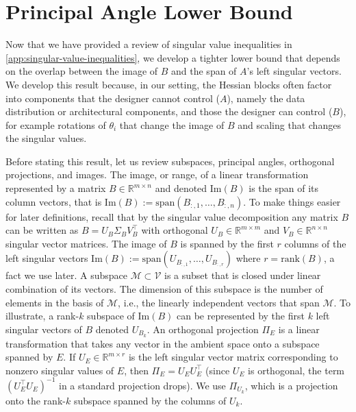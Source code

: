 \documentclass{article}
\theoremstyle{plain}
\theoremstyle{definition}
\theoremstyle{remark}
\begin{document}
\section{Principal Angle Lower Bound}
\label{app:principal-angle-lower-bound}

Now that we have provided a review of singular value inequalities in \cref{app:singular-value-inequalities}, we develop a tighter lower bound that depends on the overlap between the image of $B$ and the span of $A$'s left singular vectors. We develop this result because, in our setting, the Hessian blocks often factor into components that the designer cannot control ($A$), namely the data distribution or architectural components, and those the designer can control ($B$), for example rotations of $\theta_i$ that change the image of $B$ and scaling that changes the singular values.

Before stating this result, let us review subspaces, principal angles, orthogonal projections, and images. The image, or range, of a linear transformation represented by a matrix $B \in \mathbb{R}^{m \times n}$ and denoted $\mathrm{Im}(B)$ is the span of its column vectors, that is $\mathrm{Im}(B) := \mathrm{span}(B_{:,1}, \ldots, B_{:,n})$. To make things easier for later definitions, recall that by the singular value decomposition any matrix $B$ can be written as $B = U_B\Sigma_B V_B^{\top}$ with orthogonal $U_B \in \mathbb{R}^{m \times m}$ and $V_B \in \mathbb{R}^{n \times n}$ singular vector matrices. The image of $B$ is spanned by the first $r$ columns of the left singular vectors $\mathrm{Im}(B) := \mathrm{span}(U_{B_{:,1}}, \ldots, U_{B_{:,r}})$ where $r = \mathrm{rank}(B)$, a fact we use later. A subspace $\mathcal{M} \subset \mathcal{V}$ is a subset that is closed under linear combination of its vectors. The dimension of this subspace is the number of elements in the basis of $\mathcal{M}$, i.e., the linearly independent vectors that span $\mathcal{M}$. To illustrate, a rank-$k$ subspace of $\mathrm{Im}(B)$ can be represented by the first $k$ left singular vectors of $B$ denoted $U_{B_k}$. An orthogonal projection $\Pi_{E}$ is a linear transformation that takes any vector in the ambient space onto a subspace spanned by $E$. If $U_E \in \mathbb{R}^{m \times r}$ is the left singular vector matrix corresponding to nonzero singular values of $E$, then $\Pi_{E} = U_E U_E^{\top}$ (since $U_E$ is orthogonal, the term $(U_E^{\top}U_E)^{-1}$ in a standard projection drops). We use $\Pi_{U_k}$, which is a projection onto the rank-$k$ subspace spanned by the columns of $U_k$.
\end{document}
